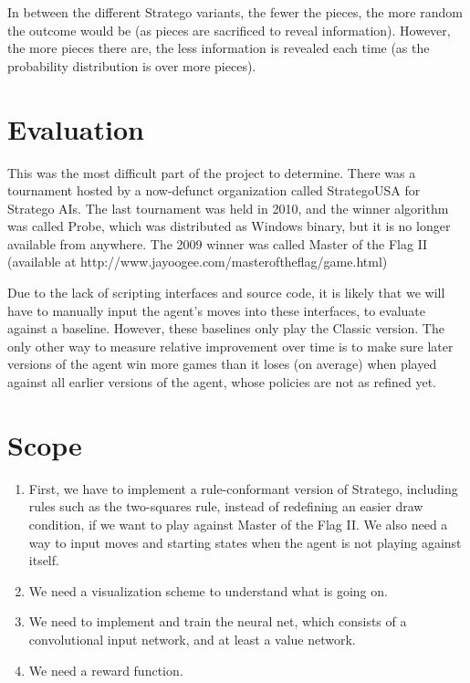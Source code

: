 \documentclass{article}
\begin{document}
In between the different Stratego variants, the fewer the pieces, the more random the outcome would be (as pieces are sacrificed to reveal information). However, the more pieces there are, the less information is revealed each time (as the probability distribution is over more pieces).

\section{Evaluation}
This was the most difficult part of the project to determine. There was a tournament hosted by a now-defunct organization called StrategoUSA for Stratego AIs. The last tournament was held in 2010, and the winner algorithm was called Probe, which was distributed as Windows binary, but it is no longer available from anywhere. The 2009 winner was called Master of the Flag II (available at http://www.jayoogee.com/masteroftheflag/game.html)

Due to the lack of scripting interfaces and source code, it is likely that we will have to manually input the agent's moves into these interfaces, to evaluate against a baseline. However, these baselines only play the Classic version. The only other way to measure relative improvement over time is to make sure later versions of the agent win more games than it loses (on average) when played against all earlier versions of the agent, whose policies are not as refined yet.

\section{Scope}
\begin{enumerate}
\item First, we have to implement a rule-conformant version of Stratego, including rules such as the two-squares rule, instead of redefining an easier draw condition, if we want to play against Master of the Flag II. We also need a way to input moves and starting states when the agent is not playing against itself.
\item We need a visualization scheme to understand what is going on.
\item We need to implement and train the neural net, which consists of a convolutional input network, and at least a value network.
\item We need a reward function.
\end{enumerate}

\nocite{langley00}



\end{document}
